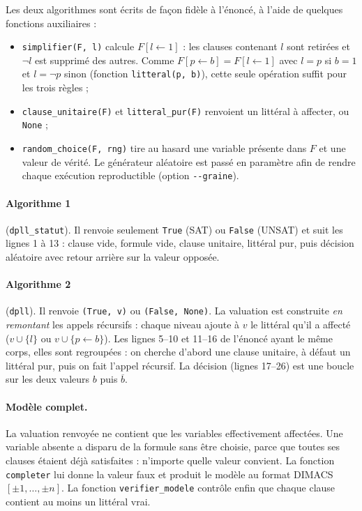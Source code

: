 \documentclass[11pt,a4paper]{article}
\begin{document}
Les deux algorithmes sont écrits de façon fidèle à l'énoncé, à l'aide de quelques fonctions
auxiliaires :
\begin{itemize}
  \item \texttt{simplifier(F, l)} calcule $F[l\leftarrow1]$ : les clauses contenant $l$ sont
        retirées et $\neg l$ est supprimé des autres. Comme $F[p\leftarrow b]=F[l\leftarrow1]$
        avec $l=p$ si $b=1$ et $l=\neg p$ sinon (fonction \texttt{litteral(p, b)}), cette seule
        opération suffit pour les trois règles ;
  \item \texttt{clause\_unitaire(F)} et \texttt{litteral\_pur(F)} renvoient un littéral à
        affecter, ou \texttt{None} ;
  \item \texttt{random\_choice(F, rng)} tire au hasard une variable présente dans $F$ et une
        valeur de vérité. Le générateur aléatoire est passé en paramètre afin de rendre chaque
        exécution reproductible (option \texttt{-{}-graine}).
\end{itemize}

\paragraph{Algorithme 1} (\texttt{dpll\_statut}). Il renvoie seulement \texttt{True} (SAT) ou
\texttt{False} (UNSAT) et suit les lignes 1 à 13 : clause vide, formule vide, clause unitaire,
littéral pur, puis décision aléatoire avec retour arrière sur la valeur opposée.

\paragraph{Algorithme 2} (\texttt{dpll}). Il renvoie \texttt{(True, v)} ou \texttt{(False, None)}.
La valuation est construite \emph{en remontant} les appels récursifs : chaque niveau ajoute à $v$
le littéral qu'il a affecté ($v\cup\{l\}$ ou $v\cup\{p\leftarrow b\}$). Les lignes 5--10 et
11--16 de l'énoncé ayant le même corps, elles sont regroupées : on cherche d'abord une clause
unitaire, à défaut un littéral pur, puis on fait l'appel récursif. La décision (lignes 17--26)
est une boucle sur les deux valeurs $b$ puis $\overline b$.

\paragraph{Modèle complet.} La valuation renvoyée ne contient que les variables effectivement
affectées. Une variable absente a disparu de la formule sans être choisie, parce que toutes ses
clauses étaient déjà satisfaites : n'importe quelle valeur convient. La fonction
\texttt{completer} lui donne la valeur faux et produit le modèle au format DIMACS
$[\pm1,\dots,\pm n]$. La fonction \texttt{verifier\_modele} contrôle enfin que chaque clause
contient au moins un littéral vrai.
\end{document}
